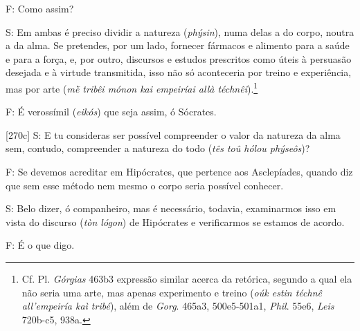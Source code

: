 F: Como assim?

S: Em ambas é preciso dividir a natureza (\emph{phýsin}), numa delas a
do corpo, noutra a da alma. Se pretendes, por um lado, fornecer fármacos
e alimento para a saúde e para a força, e, por outro, discursos e
estudos prescritos como úteis à persuasão desejada e à virtude
transmitida, isso não só aconteceria por treino e experiência, mas por
arte (\emph{mḕ tribêi mónon kai empeiríai allà téchnêi}).\footnote{Cf.
  Pl. \emph{Górgias} 463b3 expressão similar acerca da retórica, segundo
  a qual ela não seria uma arte, mas apenas experimento e treino
  (\emph{oúk estin téchnê all'empeiría kaì tribé}), além de \emph{Gorg}.
  465a3, 500e5-501a1, \emph{Phil}. 55e6, \emph{Leis} 720b-c5, 938a.}

F: É verossímil (\emph{eikós}) que seja assim, ó Sócrates.

{[}270c{]} S: E tu consideras ser possível compreender o valor da
natureza da alma sem, contudo, compreender a natureza do todo (\emph{tês
toû hólou phýseôs})?

F: Se devemos acreditar em Hipócrates, que pertence aos Asclepíades,
quando diz que sem esse método nem mesmo o corpo seria possível
conhecer.

S: Belo dizer, ó companheiro, mas é necessário, todavia, examinarmos
isso em vista do discurso (\emph{tòn lógon}) de Hipócrates e
verificarmos se estamos de acordo.

F: É o que digo.

